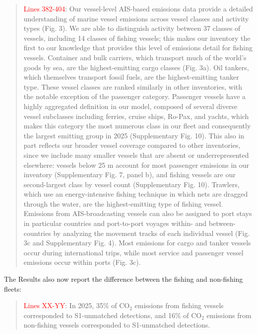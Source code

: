 \documentclass[11pt]{article}
\begin{document}
\begin{quote}
\textcolor{red}{Lines 382-404}: Our vessel-level AIS-based emissions data provide a detailed understanding of marine vessel emissions across vessel classes and activity types (Fig. 3). We are able to distinguish activity between 37 classes of vessels, including 14 classes of fishing vessels; this makes our inventory the first to our knowledge that provides this level of emissions detail for fishing vessels. Container and bulk carriers, which transport much of the world's goods by sea, are the highest-emitting cargo classes (Fig. 3a). Oil tankers, which themselves transport fossil fuels, are the highest-emitting tanker type. These vessel classes are ranked similarly in other inventories, with the notable exception of the passenger category. Passenger vessels have a highly aggregated definition in our model, composed of several diverse vessel subclasses including ferries, cruise ships, Ro-Pax, and yachts, which makes this category the most numerous class in our fleet and consequently the largest emitting group in 2025 (Supplementary Fig. 10). This also in part reflects our broader vessel coverage compared to other inventories, since we include many smaller vessels that are absent or underrepresented elsewhere: vessels below 25 m account for most passenger emissions in our inventory (Supplementary Fig. 7, panel b), and fishing vessels are our second-largest class by vessel count (Supplementary Fig. 10). Trawlers, which use an energy-intensive fishing technique in which nets are dragged through the water, are the highest-emitting type of fishing vessel. Emissions from AIS-broadcasting vessels can also be assigned to port stays in particular countries and port-to-port voyages within- and between-countries by analyzing the movement tracks of each individual vessel (Fig. 3c and Supplementary Fig. 4). Most emissions for cargo and tanker vessels occur during international trips, while most service and passenger vessel emissions occur within ports (Fig. 3c).
\end{quote}

The Results also now report the difference between the fishing and non-fishing fleets:

\begin{quote}
\textcolor{red}{Lines XX-YY}: In 2025, 35\% of CO$_{2}$ emissions from fishing vessels corresponded to S1-unmatched detections, and 16\% of CO$_{2}$ emissions from non-fishing vessels corresponded to S1-unmatched detections.
\end{quote}
\end{document}
